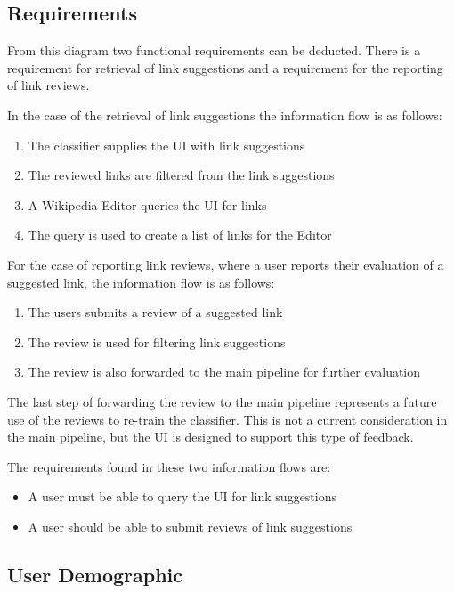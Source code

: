 \subsection{Requirements}

From this diagram two functional requirements can be deducted. There is a requirement for retrieval of link suggestions and a requirement for the reporting of link reviews.

In the case of the retrieval of link suggestions the information flow is as follows:

\begin{enumerate}
	\item The classifier supplies the UI with link suggestions
	\item The reviewed links are filtered from the link suggestions
	\item A Wikipedia Editor queries the UI for links
	\item The query is used to create a list of links for the Editor
\end{enumerate}

For the case of reporting link reviews, where a user reports their evaluation of a suggested link, the information flow is as follows:

\begin{enumerate}
	\item The users submits a review of a suggested link
	\item The review is used for filtering link suggestions
	\item The review is also forwarded to the main pipeline for further evaluation
\end{enumerate}

The last step of forwarding the review to the main pipeline represents a future use of the reviews to re-train the classifier. This is not a current consideration in the main pipeline, but the UI is designed to support this type of feedback.

The requirements found in these two information flows are:

\begin{itemize}
	\item A user must be able to query the UI for link suggestions
	\item A user should be able to submit reviews of link suggestions
\end{itemize}

\subsection{User Demographic}

